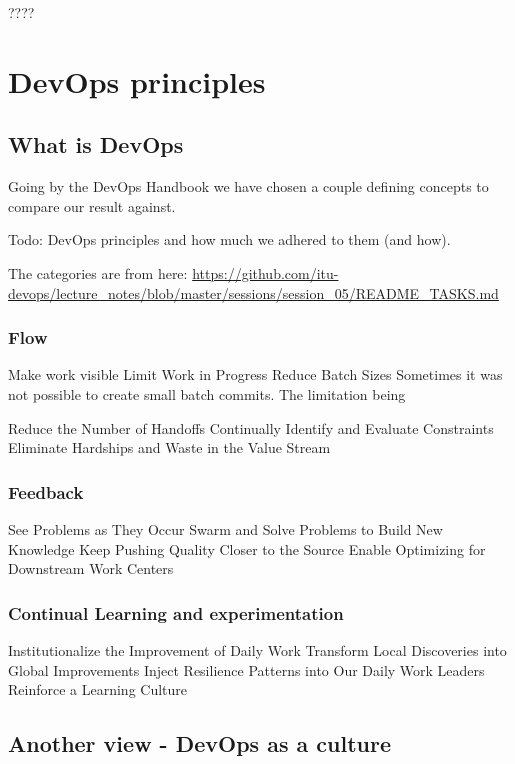 \documentclass{article}
\begin{document}
????


\section{DevOps principles}

\subsection{What is DevOps}

Going by the DevOps Handbook \cite{devopshandbook} we have chosen a couple defining concepts to compare our result against. 

Todo: DevOps principles and how much we adhered to them (and how).

The categories are from here:
\url{https://github.com/itu-devops/lecture_notes/blob/master/sessions/session_05/README_TASKS.md}

\subsubsection{Flow}

Make work visible
Limit Work in Progress
Reduce Batch Sizes
Sometimes it was not possible to create small batch commits. The limitation being 

    Reduce the Number of Handoffs
    Continually Identify and Evaluate Constraints
    Eliminate Hardships and Waste in the Value Stream



\subsubsection{Feedback}

    See Problems as They Occur
    Swarm and Solve Problems to Build New Knowledge
    Keep Pushing Quality Closer to the Source
    Enable Optimizing for Downstream Work Centers


\subsubsection{Continual Learning and experimentation}

    Institutionalize the Improvement of Daily Work
    Transform Local Discoveries into Global Improvements
    Inject Resilience Patterns into Our Daily Work
    Leaders Reinforce a Learning Culture


\subsection{Another view - DevOps as a culture}
\end{document}
